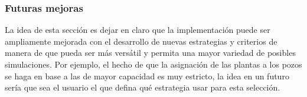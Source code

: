 \subsubsection{Futuras mejoras}

La idea de esta sección es dejar en claro que la implementación puede ser ampliamente mejorada con el desarrollo de nuevas estrategias y criterios de manera de que pueda ser más versátil y permita una mayor variedad de posibles simulaciones. Por ejemplo, el hecho de que la asignación de las plantas a los pozos se haga en base a las de mayor capacidad es muy estricto, la idea en un futuro sería que sea el usuario el que defina qué estrategia usar para esta selección.


